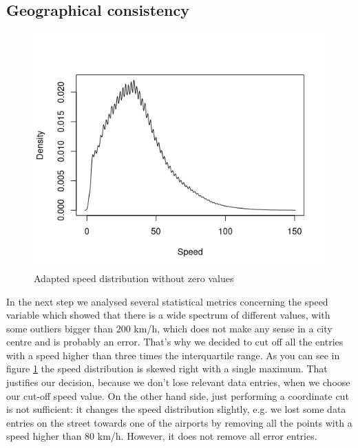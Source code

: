 \documentclass[11pt,conference,a4paper,onecolumn,romanappendices]{IEEEtran}
\begin{document}
\subsection{Geographical consistency}
\begin{figure}
\includegraphics[scale=0.67]{speed.png}
\caption{\label{fig:speed}Adapted speed distribution without zero values}
\end{figure}
In the next step we analysed several statistical metrics concerning the speed variable which showed that there is a wide spectrum of different values, with some outliers bigger than 200 km/h, which does not make any sense in a city centre and is probably an error. That's why we decided to cut off all the entries with a speed higher than three times the interquartile range. As you can see in figure \ref{fig:speed} the speed distribution is skewed right with a single maximum. That justifies our decision, because we don't lose relevant data entries, when we choose our cut-off speed value. On the other hand side, just performing a coordinate cut is not sufficient: it changes the speed distribution slightly, e.g. we lost some data entries on the street towards one of the airports by removing all the points with a speed higher than 80 km/h. However, it does not remove all error entries. \\
\end{document}
